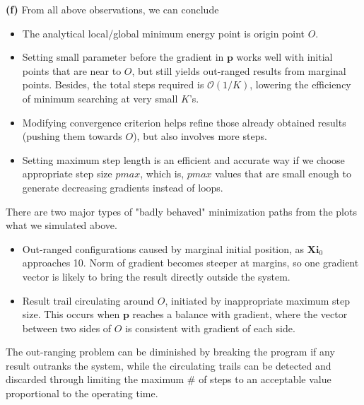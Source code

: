 \documentclass{article}
\begin{document}
\vspace{3mm}
\noindent
\textbf{(f)} From all above observations, we can conclude
\begin{itemize}
    \item The analytical local/global minimum energy point is origin point $O$.
    \item Setting small parameter before the gradient in $\mathbf{p}$ works well with initial points that are near to $O$, but still yields out-ranged results from marginal points. Besides, the total steps required is $\mathcal{O}(1/K)$, lowering the efficiency of minimum searching at very small $K$'s.
    \item Modifying convergence criterion helps refine those already obtained results (pushing them towards $O$), but also involves more steps.  
    \item Setting maximum step length is an efficient and accurate way if we choose appropriate step size $pmax$, which is, $pmax$ values that are small enough to generate decreasing gradients instead of loops.
\end{itemize}

There are two major types of "badly behaved" minimization paths from the plots what we simulated above.
\begin{itemize}
    \item Out-ranged configurations caused by marginal initial position, as $\mathbf{Xi}_0$ approaches 10. Norm of gradient becomes steeper at margins, so one gradient vector is likely to bring the result directly outside the system. 
    \item Result trail circulating around $O$, initiated by inappropriate maximum step size. This occurs when $\mathbf{p}$ reaches a balance with gradient, where the vector between two sides of $O$ is consistent with gradient of each side. 
\end{itemize}

The out-ranging problem can be diminished by breaking the program if any result outranks the system, while the circulating trails can be detected and discarded through limiting the maximum \# of steps to an acceptable value proportional to the operating time.
\end{document}
